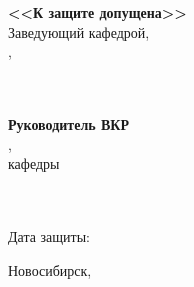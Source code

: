 \begin{titlepage}
\begin{flushleft}
	\begin{minipage}[b]{0.35\textwidth}
		\textbf{<<К защите допущена>>} \\
		Заведующий кафедрой, \\
		\apdegree, \aprank \\
		\apname \\
		\infotemplate \\[2mm]
		\datetemplate
	\end{minipage}
	\hspace{25mm}
	\begin{minipage}[b]{0.35\textwidth}
		\textbf{Руководитель ВКР} \\
		\sadegree, \sarank \\
		кафедры \department \\
		\saname \\
		\infotemplate \\[2mm]
		\datetemplate
	\end{minipage}
\end{flushleft}

\begin{flushright}
	\vfill
	Дата защиты: \datetemplate
	\vfill
\end{flushright}

\begingroup
	\fontsize{10pt}{12pt}\selectfont
	\begin{center}  
		Новосибирск, \currentyear[\uline]
	\end{center}
\endgroup

\end{titlepage}